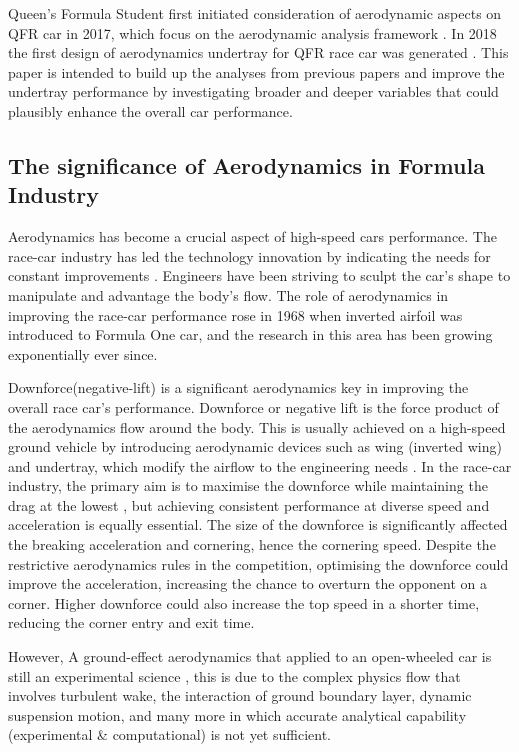 \noindent Queen's Formula Student first initiated consideration of aerodynamic aspects on QFR car in 2017, which focus on the aerodynamic analysis framework \cite{Corr2017MechanicalAuthor}. In 2018 the first design of aerodynamics undertray for QFR race car was generated \cite{McKeown2018DesignCar}. This paper is intended to build up the analyses from previous papers and improve the undertray performance by investigating broader and deeper variables that could plausibly enhance the overall car performance. 

\subsection{The significance of Aerodynamics in Formula Industry}
Aerodynamics has become a crucial aspect of high-speed cars performance. The race-car industry has led the technology innovation by indicating the needs for constant improvements \cite{Zhang2006GroundCars}. Engineers have been striving to sculpt the car's shape to manipulate and advantage the body's flow. The role of aerodynamics in improving the race-car performance rose in 1968 when inverted airfoil was introduced to Formula One car, and the research in this area has been growing exponentially ever since. 


\noindent Downforce(negative-lift) is a significant aerodynamics key in improving the overall race car's performance. Downforce or negative lift is the force product of the aerodynamics flow around the body. This is usually achieved on a high-speed ground vehicle by introducing aerodynamic devices such as wing (inverted wing) and undertray, which modify the airflow to the engineering needs \cite{Wright1982TheCars}. In the race-car industry, the primary aim is to maximise the downforce while maintaining the drag at the lowest \cite{Zhang2006GroundCars}, but achieving consistent performance at diverse speed and acceleration is equally essential.  The size of the downforce is significantly affected the breaking acceleration and cornering, hence the cornering speed. Despite the restrictive aerodynamics rules in the competition, optimising the downforce could improve the acceleration, increasing the chance to overturn the opponent on a corner. Higher downforce could also increase the top speed in a shorter time, reducing the corner entry and exit time. 

\noindent However, A ground-effect aerodynamics that applied to an open-wheeled car is still an experimental science \cite{Zhang2006GroundCars}, this is due to the complex physics flow that involves turbulent wake, the interaction of ground boundary layer, dynamic suspension motion, and many more in which accurate analytical capability (experimental \& computational) is not yet sufficient.

